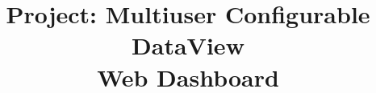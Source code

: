 \documentclass{unicam_thesis}
\title{Project: Multiuser Configurable DataView \\ Web Dashboard}
\theoremstyle{definition} \newtheorem{esempio}{Esempio}[chapter]
\theoremstyle{definition}
\begin{document}
\maketitle

\tableofcontents
\lstlistoflistings
\listoffigures








\appendix


\printbibliography


\printindex

%
\end{document}
